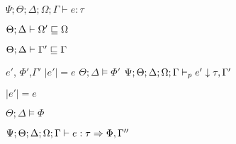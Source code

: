 {{{     $\Psi ; \Theta ; \Delta ; \Omega ; \Gamma \vdash e : \tau$

     $\Theta ; \Delta \vdash \Omega' \sqsubseteq \Omega$

     $\Theta ; \Delta \vdash \Gamma' \sqsubseteq \Gamma$
  }{
    $e'$, $\Phi'$,$\Gamma'$  
  }{
    $|e'| = e$
  }{
    $\Theta ; \Delta \vDash \Phi'$  
  }{
    $\Psi ; \Theta ; \Delta ; \Omega ; \Gamma \vdash_p e' \downarrow \tau,\Gamma'$  
  }


   $|e'| = e$

   $\Theta ; \Delta \vDash \Phi$

   $\Psi ; \Theta ; \Delta ; \Omega ; \Gamma \vdash e : \tau \Rightarrow \Phi, \Gamma''$


 }
}